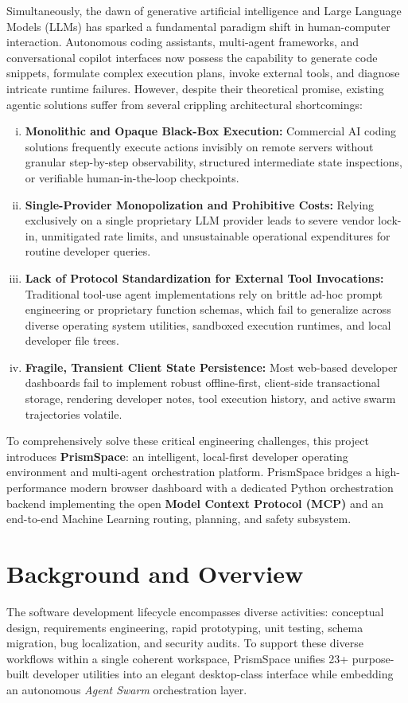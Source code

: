 \documentclass[12pt,a4paper]{report}
\begin{document}
Simultaneously, the dawn of generative artificial intelligence and Large Language Models (LLMs) has sparked a fundamental paradigm shift in human-computer interaction. Autonomous coding assistants, multi-agent frameworks, and conversational copilot interfaces now possess the capability to generate code snippets, formulate complex execution plans, invoke external tools, and diagnose intricate runtime failures. However, despite their theoretical promise, existing agentic solutions suffer from several crippling architectural shortcomings:
\begin{enumerate}[(i)]
    \item \textbf{Monolithic and Opaque Black-Box Execution:} Commercial AI coding solutions frequently execute actions invisibly on remote servers without granular step-by-step observability, structured intermediate state inspections, or verifiable human-in-the-loop checkpoints.
    \item \textbf{Single-Provider Monopolization and Prohibitive Costs:} Relying exclusively on a single proprietary LLM provider leads to severe vendor lock-in, unmitigated rate limits, and unsustainable operational expenditures for routine developer queries.
    \item \textbf{Lack of Protocol Standardization for External Tool Invocations:} Traditional tool-use agent implementations rely on brittle ad-hoc prompt engineering or proprietary function schemas, which fail to generalize across diverse operating system utilities, sandboxed execution runtimes, and local developer file trees.
    \item \textbf{Fragile, Transient Client State Persistence:} Most web-based developer dashboards fail to implement robust offline-first, client-side transactional storage, rendering developer notes, tool execution history, and active swarm trajectories volatile.
\end{enumerate}

To comprehensively solve these critical engineering challenges, this project introduces \textbf{PrismSpace}: an intelligent, local-first developer operating environment and multi-agent orchestration platform. PrismSpace bridges a high-performance modern browser dashboard with a dedicated Python orchestration backend implementing the open \textbf{Model Context Protocol (MCP)} and an end-to-end Machine Learning routing, planning, and safety subsystem.

\section{Background and Overview}
The software development lifecycle encompasses diverse activities: conceptual design, requirements engineering, rapid prototyping, unit testing, schema migration, bug localization, and security audits. To support these diverse workflows within a single coherent workspace, PrismSpace unifies 23+ purpose-built developer utilities into an elegant desktop-class interface while embedding an autonomous \textit{Agent Swarm} orchestration layer.
\end{document}
